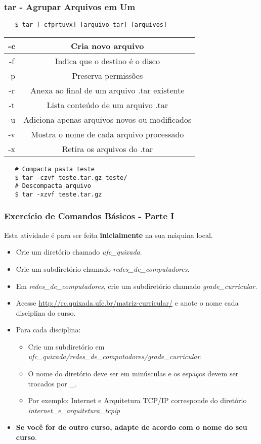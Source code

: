 \documentclass{beamer}
\begin{document}
\begin{frame}[fragile]
   \frametitle{tar - Agrupar Arquivos em Um}
   \begin{verbatim}
   $ tar [-cfprtuvx] [arquivo_tar] [arquivos]
   \end{verbatim}
   \begin{table}
      \begin{tabular}{ c | c }
         -c & Cria novo arquivo \\
         \hline 
         -f & Indica que o destino é o disco \\ 
         \hline
	 -p & Preserva permissões \\
         \hline 
         -r & Anexa ao final de um arquivo .tar existente \\ 
         \hline
         -t & Lista conteúdo de um arquivo .tar \\ 
         \hline
         -u & Adiciona apenas arquivos novos ou modificados  \\
         \hline 
         -v & Mostra o nome de cada arquivo processado \\ 
         \hline
         -x & Retira os arquivos do .tar \\ 
      \end{tabular}
   \end{table}
   \begin{verbatim}
   # Compacta pasta teste
   $ tar -czvf teste.tar.gz teste/
   # Descompacta arquivo
   $ tar -xzvf teste.tar.gz
   \end{verbatim}
\end{frame}

   \begin{frame}
      \frametitle{Exercício de Comandos Básicos - Parte I}
      Esta atividade é para ser feita \textbf{inicialmente} na sua máquina local.
      \begin{itemize}
         \item Crie um diretório chamado \textit{ufc\_quixada}.
	      \item Crie um subdiretório chamado \textit{redes\_de\_computadores}.
	      \item Em \textit{redes\_de\_computadores}, crie um subdiretório chamado \textit{grade\_curricular}.
         \item Acesse \url{http://rc.quixada.ufc.br/matriz-curricular/} e anote o nome cada disciplina do curso.
         \item Para cada disciplina:
	      \begin{itemize}
	         \item Crie um subdiretório em \textit{ufc\_quixada/redes\_de\_computadores/grade\_curricular}.
	         \item O nome do diretório deve ser em minúsculas e os espaços devem ser trocados por \_.
	         \item Por exemplo: Internet e Arquitetura TCP/IP corresponde do diretório \textit{internet\_e\_arquitetura\_tcpip}
         \end{itemize}
         \item \textbf{Se você for de outro curso, adapte de acordo com o nome do seu curso}.
      \end{itemize}
   \end{frame}
\end{document}
